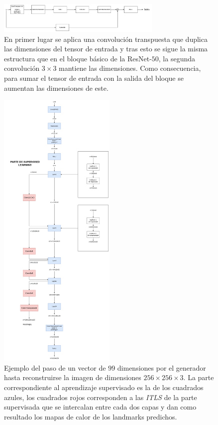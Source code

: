             \begin{figure}[!h]
                \centering
                \includegraphics[width=0.7\textwidth]{img/bloque_invresnet.png}
                \caption{En primer lugar se aplica una convolución transpuesta que duplica las dimensiones del tensor de entrada y tras esto se sigue la misma estructura que en el bloque básico de la ResNet-$50$, la segunda convolución $3\times 3$ mantiene las dimensiones. Como consecuencia, para sumar el tensor de entrada con la salida del bloque se aumentan las dimensiones de este.}
                \label{fig:Bloque_Decoder}
            \end{figure}

            \begin{figure}[!h]
                \centering
                \includegraphics[width=0.5\textwidth]{img/paso_generator.png}
                \caption{Ejemplo del paso de un vector de $99$ dimensiones por el generador hasta reconstruirse la imagen de dimensiones $256 \times 256 \times 3$. La parte correspondiente al aprendizaje supervisado es la de los cuadrados azules, los cuadrados rojos corresponden a las \textit{ITLS} de la parte supervisada que se intercalan entre cada dos capas y dan como resultado los mapas de calor de los landmarks predichos.}
                \label{fig:Paso_Generator}
            \end{figure}

